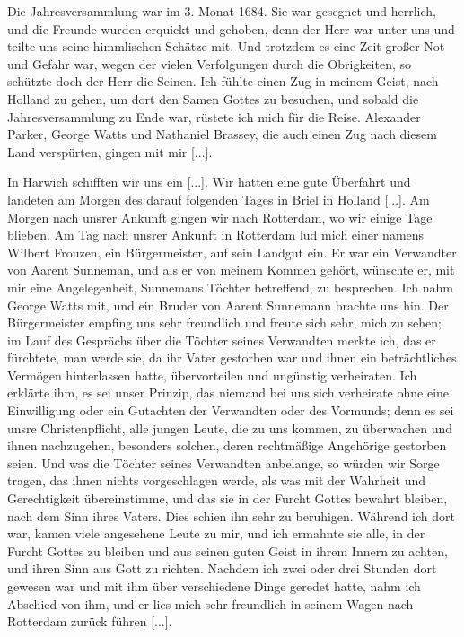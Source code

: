 Die Jahresversammlung war im 3. Monat 1684. Sie war 
gesegnet und herrlich, und die Freunde wurden erquickt und gehoben,
denn der Herr war unter uns und teilte uns seine himmlischen
Schätze mit. Und trotzdem es eine Zeit großer Not und Gefahr
war, wegen der vielen Verfolgungen durch die Obrigkeiten, so
schützte doch der Herr die Seinen.
Ich fühlte einen Zug in meinem Geist, nach Holland zu gehen,
um dort den Samen Gottes zu besuchen, und sobald die 
Jahresversammlung zu Ende war, rüstete ich mich für die Reise.
Alexander Parker, George
Watts und Nathaniel 
Brassey, die
auch einen Zug nach diesem Land verspürten, gingen mit mir [...].

In Harwich schifften wir uns ein [...]. Wir hatten eine gute
Überfahrt und landeten am Morgen des darauf folgenden Tages
in Briel in Holland [...]. Am Morgen nach unsrer Ankunft
gingen wir nach Rotterdam, wo wir einige Tage blieben. Am
Tag nach unsrer Ankunft in Rotterdam lud mich einer namens
Wilbert Frouzen, ein Bürgermeister, auf sein Landgut ein. Er
war ein Verwandter von Aarent Sunneman, und als er von
meinem Kommen gehört, wünschte er, mit mir eine Angelegenheit,
Sunnemans Töchter betreffend, zu besprechen. Ich nahm George
Watts mit, und ein Bruder von Aarent Sunnemann brachte uns
hin. Der Bürgermeister empfing uns sehr freundlich und freute
sich sehr, mich zu sehen; im Lauf des Gesprächs über die Töchter
seines Verwandten merkte ich, das er fürchtete, man werde sie,
da ihr Vater gestorben war und ihnen ein beträchtliches Vermögen
hinterlassen hatte, übervorteilen und ungünstig verheiraten. Ich 
erklärte ihm, es sei unser Prinzip, das niemand bei uns sich 
verheirate ohne eine Einwilligung oder ein Gutachten der Verwandten
oder des Vormunds; denn es sei unsre Christenpflicht, alle jungen
Leute, die zu uns kommen, zu überwachen und ihnen nachzugehen,
besonders solchen, deren rechtmäßige Angehörige gestorben seien.
Und was die Töchter seines Verwandten anbelange, so würden
wir Sorge tragen, das ihnen nichts vorgeschlagen werde, als was
mit der Wahrheit und Gerechtigkeit übereinstimme, und das sie
in der Furcht Gottes bewahrt bleiben, nach dem Sinn ihres
Vaters. Dies schien ihn sehr zu beruhigen. Während ich dort
war, kamen viele angesehene Leute zu mir, und ich ermahnte sie
alle, in der Furcht Gottes zu bleiben und aus seinen guten Geist
in ihrem Innern zu achten, und ihren Sinn aus Gott zu richten.
Nachdem ich zwei oder drei Stunden dort gewesen war und mit
ihm über verschiedene Dinge geredet hatte, nahm ich Abschied von
ihm, und er lies mich sehr freundlich in seinem Wagen nach
Rotterdam zurück führen [...].

